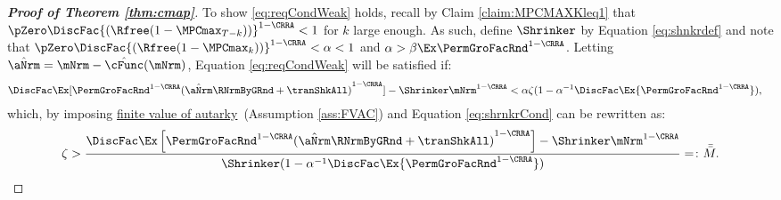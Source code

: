 \documentclass[\econtexRoot/BufferStockTheory]{subfiles}
\begin{document}
\begin{proof}[\textbf{Proof of Theorem \ref{thm:cmap}}]
To show \eqref{eq:reqCondWeak} holds, recall by Claim \ref{claim:MPCMAXKleq1} that $\pZero \DiscFac {(\Rfree (1-\MPCmax_{T-k}))}^{1-\CRRA}   < 1$ for $k$ large enough.
As such, define $\Shrinker$ by Equation \eqref{eq:shnkrdef} and note that $\pZero \DiscFac {(\Rfree (1-\MPCmax_{k}))}^{1-\CRRA} < \alpha < 1$ and $\alpha> \beta\Ex\PermGroFacRnd^{1-\CRRA}$.
Letting $\hat{\aNrm} = \mNrm - \hat{\cFunc}(\mNrm)$, Equation \eqref{eq:reqCondWeak} will be satisfied if:
%
\begin{align*}
  \DiscFac \Ex [{\PermGroFacRnd^{1-\CRRA }}{(\hat{\aNrm}\RNrmByGRnd+\tranShkAll)}^{1-\CRRA}]-\Shrinker\mNrm^{1-\CRRA}  & < \alpha\zeta(1-\alpha^{-1}\DiscFac\Ex {\PermGroFacRnd^{1-\CRRA }}),
\end{align*}
%
which, by imposing \hyperlink{FVAC}{finite value of autarky}~(Assumption \ref{ass:FVAC}) and Equation \eqref{eq:shrnkrCond} can be rewritten as:
%
\begin{equation}\begin{gathered}\begin{aligned}
      \zeta >\frac{\DiscFac \Ex\left[\PermGroFacRnd^{1-\CRRA}{(\hat{\aNrm}\RNrmByGRnd +\tranShkAll)}^{1-\CRRA}\right]- \Shrinker\mNrm^{1-\CRRA}}{\Shrinker(1-\alpha^{-1}\DiscFac\Ex {\PermGroFacRnd^{1-\CRRA }})}= \colon\bar{\bar{M}} \label{eq:KeyCondition}.
    \end{aligned}\end{gathered}\end{equation}


\end{proof}
\end{document}
